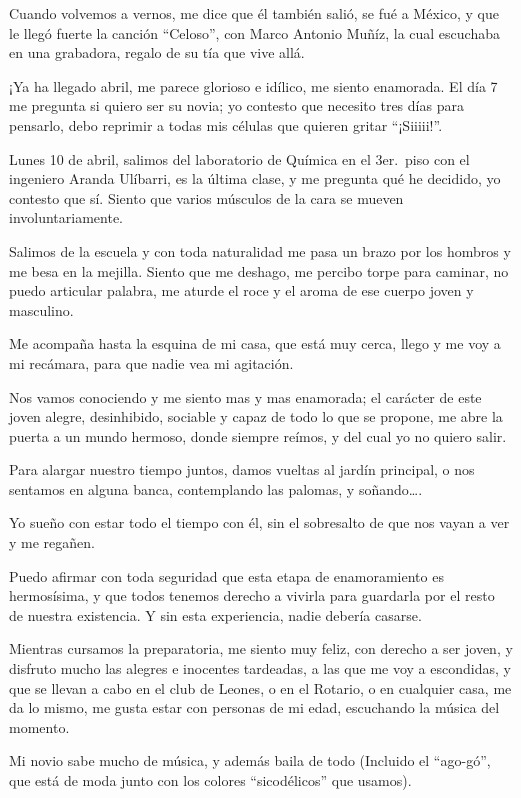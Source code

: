 \documentclass[letterpaper, 12pt]{book}
\begin{document}
Cuando volvemos a vernos, me dice que él también salió, se fué a  México, y que le llegó fuerte la canción ``Celoso'', con Marco Antonio Muñíz, la cual escuchaba en una grabadora, regalo de su tía que vive allá. 

¡Ya ha llegado abril, me parece glorioso e idílico, me siento enamorada. El día 7 me pregunta si quiero ser su novia; yo contesto que necesito tres días para pensarlo, debo reprimir a todas mis células que quieren gritar ``¡Siiiii!''.

Lunes 10 de abril, salimos del laboratorio de Química en el 3er.\ piso con el ingeniero Aranda Ulíbarri, es la última clase, y me pregunta qué he decidido, yo contesto que sí. Siento que varios músculos de la cara se mueven involuntariamente.

Salimos de la escuela y con toda naturalidad me pasa un brazo por los hombros y me besa en la mejilla. Siento que me deshago, me percibo torpe para caminar, no puedo articular palabra, me aturde el roce y el aroma de ese cuerpo joven y masculino.

Me acompaña hasta la esquina de mi casa, que está muy cerca, llego y me voy a mi recámara, para que nadie vea mi agitación.

Nos vamos conociendo y me siento mas y mas enamorada; el carácter de este joven alegre, desinhibido, sociable y capaz de todo lo que se propone, me abre la puerta a un mundo hermoso, donde siempre reímos, y del cual yo no quiero salir.

Para alargar nuestro tiempo juntos, damos vueltas al jardín principal, o nos sentamos en alguna banca, contemplando las palomas, y soñando\ldots.

Yo sueño con estar todo el tiempo con él, sin el sobresalto de que nos vayan a ver y me regañen.

Puedo afirmar con toda seguridad que esta etapa de enamoramiento es hermosísima, y que todos tenemos derecho a vivirla para guardarla por el resto de nuestra existencia. Y sin esta experiencia, nadie debería casarse.

Mientras cursamos la preparatoria, me siento muy feliz, con derecho a ser joven, y disfruto mucho las alegres e inocentes tardeadas, a las que me voy a escondidas, y que se llevan a cabo en el club de Leones, o en el Rotario, o en cualquier casa, me da lo mismo, me gusta estar con personas de mi edad, escuchando la música del momento. 

Mi novio sabe mucho de música, y además baila de todo (Incluido el  ``ago-gó'', que está de moda junto con los colores ``sicodélicos'' que usamos).
\end{document}
